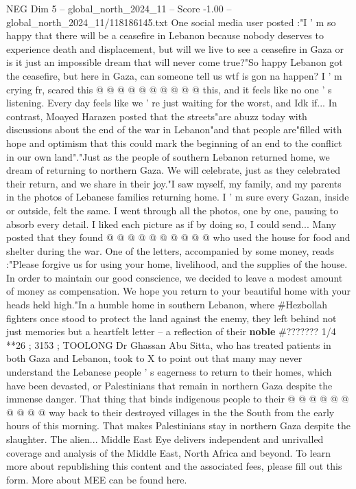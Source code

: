 \begin{textsample}{NEG Dim 5 – global\_north\_2024\_11 – Score -1.00 – global\_north\_2024\_11/118186145.txt}
One social media user posted :"I ' m so happy that there will be a ceasefire in Lebanon because nobody deserves to experience death and displacement, but will we live to see a ceasefire in Gaza or is it just an impossible dream that will never come true?"So happy Lebanon got the ceasefire, but here in Gaza, can someone tell us wtf is gon na happen?
I ' m crying fr, scared this @ @ @ @ @ @ @ @ @ @ this, and it feels like no one ' s listening.
Every day feels like we ' re just waiting for the worst, and Idk if...
In contrast, Moayed Harazen posted that the streets"are abuzz today with discussions about the end of the war in Lebanon"and that people are"filled with hope and optimism that this could mark the beginning of an end to the conflict in our own land"."Just as the people of southern Lebanon returned home, we dream of returning to northern Gaza.
We will celebrate, just as they celebrated their return, and we share in their joy."I saw myself, my family, and my parents in the photos of Lebanese families returning home.
I ' m sure every Gazan, inside or outside, felt the same.
I went through all the photos, one by one, pausing to absorb every detail.
I liked each picture as if by doing so, I could send...
Many posted that they found @ @ @ @ @ @ @ @ @ @ who used the house for food and shelter during the war.
One of the letters, accompanied by some money, reads :"Please forgive us for using your home, livelihood, and the supplies of the house.
In order to maintain our good conscience, we decided to leave a modest amount of money as compensation.
We hope you return to your beautiful home with your heads held high."In a humble home in southern Lebanon, where \#Hezbollah fighters once stood to protect the land against the enemy, they left behind not just memories but a heartfelt letter -- a reflection of their \textbf{noble} \#??????? 1/4 **26 ; 3153 ; TOOLONG Dr Ghassan Abu Sitta, who has treated patients in both Gaza and Lebanon, took to X to point out that many may never understand the Lebanese people ' s eagerness to return to their homes, which have been devasted, or Palestinians that remain in northern Gaza despite the immense danger.
That thing that binds indigenous people to their @ @ @ @ @ @ @ @ @ @ way back to their destroyed villages in the the South from the early hours of this morning.
That makes Palestinians stay in northern Gaza despite the slaughter.
The alien...
Middle East Eye delivers independent and unrivalled coverage and analysis of the Middle East, North Africa and beyond.
To learn more about republishing this content and the associated fees, please fill out this form.
More about MEE can be found here.

\end{textsample}
